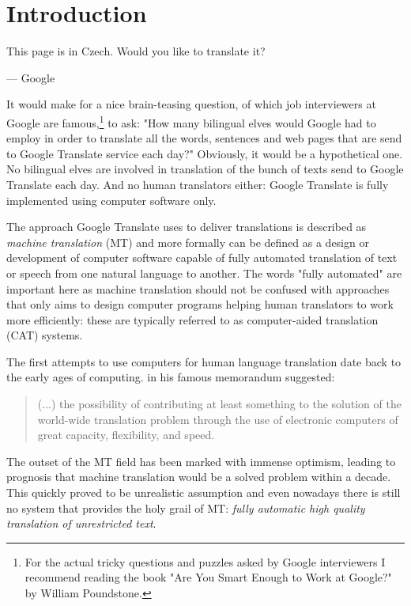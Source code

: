 \chapter{Introduction}
\label{chap:introduction}

\setlength{\epigraphwidth}{1.0\textwidth}
\epigraph{This page is in Czech. Would you like to translate it?}{--- Google}

It would make for a nice brain-teasing question, of which job interviewers
at Google are famous,\footnote{For the actual tricky questions and puzzles
asked by Google interviewers I recommend reading the book "Are You Smart
Enough to Work at Google?" by William Poundstone.} to ask:
"How many bilingual elves would Google had to employ in order to translate
all the words, sentences and web pages that are send to Google Translate
service each day?"
Obviously, it would be a hypothetical one. No bilingual elves are involved
in translation of the bunch of texts send to Google Translate each day.
And no human translators either: Google Translate is fully implemented using
computer software only.

The approach Google Translate uses to deliver translations is described as
\emph{machine translation} (MT) and more formally can be defined as a design
or development of computer software capable of fully automated translation
of text or speech from one natural language to another.
The words "fully automated" are important here as machine translation should
not be confused with approaches that only aims to design computer programs
helping human translators to work more efficiently: these are typically
referred to as computer-aided translation (CAT) systems.

The first attempts to use computers for human language translation date
back to the early ages of computing. \citet{weaver:memorandum} in his famous
memorandum suggested:
\begin{quote}
(...) the possibility of contributing at least
something to the solution of the world-wide translation problem through the use
of electronic computers of great capacity, flexibility, and speed.
\end{quote}
The outset of the MT field has been marked with immense optimism, leading
to prognosis that machine translation would be a solved problem within
a decade. %
This quickly proved to be unrealistic assumption and even nowadays
there is still no system that provides the holy grail of MT:
\emph{fully automatic high quality translation of unrestricted text}.

